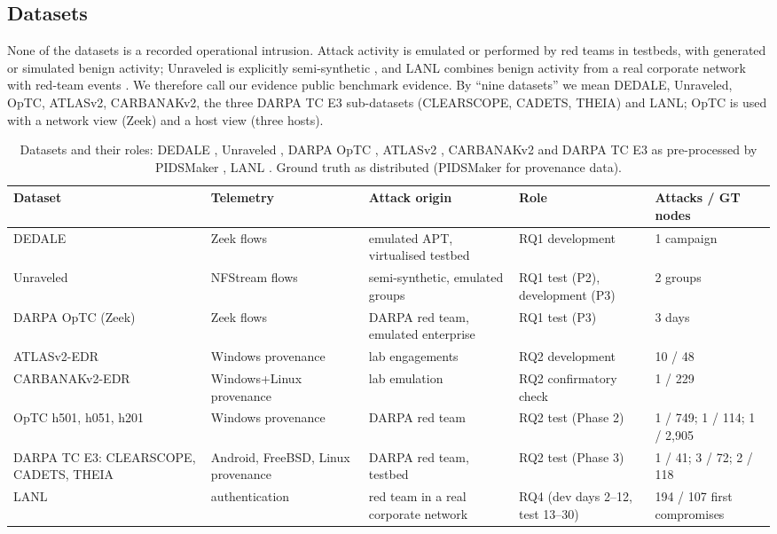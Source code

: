 \documentclass[acmlarge,screen,review]{acmart}
\begin{document}
\subsection{Datasets}
None of the datasets is a recorded operational intrusion. Attack activity is emulated or performed by red teams in
testbeds, with generated or simulated benign activity; Unraveled is explicitly semi-synthetic \cite{myneni2023unraveled},
and LANL combines benign activity from a real corporate network with red-team events \cite{kent2015lanl}. We therefore
call our evidence public benchmark evidence. By ``nine datasets'' we mean DEDALE, Unraveled, OpTC, ATLASv2,
CARBANAKv2, the three DARPA TC E3 sub-datasets (CLEARSCOPE, CADETS, THEIA) and LANL; OpTC is used with a network view
(Zeek) and a host view (three hosts).
\begin{table}[!htbp]
\centering\footnotesize
\caption{Datasets and their roles: DEDALE \cite{dedale2026}, Unraveled \cite{myneni2023unraveled}, DARPA OpTC
\cite{darpa2020optc}, ATLASv2 \cite{riddle2024atlasv2}, CARBANAKv2 and DARPA TC E3 as pre-processed by PIDSMaker
\cite{pidsmaker2026}, LANL \cite{kent2015lanl}. Ground truth as distributed (PIDSMaker for provenance data).}
\label{tab:data}
\setlength{\tabcolsep}{3pt}\footnotesize
\begin{tabularx}{\textwidth}{@{}YYYYY@{}}
\toprule
Dataset & Telemetry & Attack origin & Role & Attacks / GT nodes \\
\midrule
DEDALE & Zeek flows & emulated APT, virtualised testbed & RQ1 development & 1 campaign \\
Unraveled & NFStream flows & semi-synthetic, emulated groups & RQ1 test (P2), development (P3) & 2 groups \\
DARPA OpTC (Zeek) & Zeek flows & DARPA red team, emulated enterprise & RQ1 test (P3) & 3 days \\
ATLASv2-EDR & Windows provenance & lab engagements & RQ2 development & 10 / 48 \\
CARBANAKv2-EDR & Windows+Linux provenance & lab emulation & RQ2 confirmatory check & 1 / 229 \\
OpTC h501, h051, h201 & Windows provenance & DARPA red team & RQ2 test (Phase 2) & 1 / 749; 1 / 114; 1 / 2{,}905 \\
DARPA TC E3: CLEARSCOPE, CADETS, THEIA & Android, FreeBSD, Linux provenance & DARPA red team, testbed & RQ2 test (Phase 3) & 1 / 41; 3 / 72; 2 / 118 \\
LANL & authentication & red team in a real corporate network & RQ4 (dev days 2--12, test 13--30) & 194 / 107 first compromises \\
\bottomrule
\end{tabularx}
\end{table}
\end{document}
